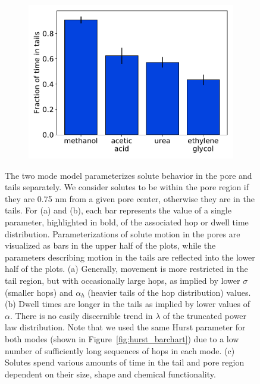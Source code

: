 \documentclass[journal=jctcce,manuscript=article]{achemso}
\begin{document}
\begin{figure}
\begin{subfigure}{0.325\textwidth}
  \includegraphics[width=\textwidth]{AD_mode_occupation.pdf}
  \caption{}\label{fig:AD_mode_occupation}
  \end{subfigure}
  \caption{%
		  The two mode model parameterizes solute behavior in the pore and tails
	      separately. We consider solutes to be within the pore region if they
	      are 0.75 nm from a given pore center, otherwise they are in the
	      tails. For (a) and (b), each bar represents the value of a single parameter, 
	      highlighted in bold, of the associated hop or dwell time distribution.
	      Parameterizations of solute motion in the pores are visualized as bars
	      in the upper half of the plots, while the parameters describing motion 
	      in the tails are reflected into the lower half of the plots.
	      (a) Generally, movement is more restricted in the tail region, but 
	      with occasionally large hops, as implied by lower $\sigma$ (smaller
	      hops) and $\alpha_h$ (heavier tails of the hop distribution) values.
	      (b) Dwell times are longer in the tails as implied by lower values 
	      of $\alpha$. There is no easily discernible trend in $\lambda$ of the
	      truncated power law distribution. Note that we used the same Hurst
	      parameter for both modes (shown in Figure~\ref{fig:hurst_barchart})
	      due to a low number of sufficiently long sequences of hops in each
	      mode. (c) Solutes spend various amounts of time in the tail and pore
	      region dependent on their size, shape and chemical functionality.
}
\end{figure}
\end{document}
